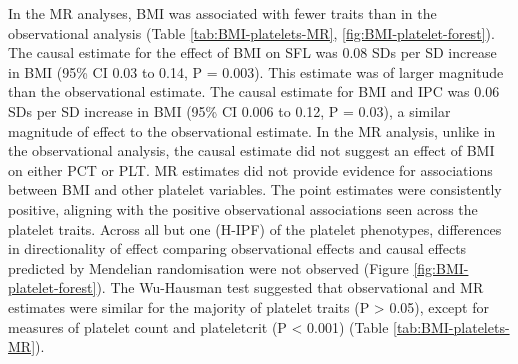 \documentclass[11pt,twoside]{bristolthesis}
\begin{document}
In the MR analyses, BMI was associated with fewer traits than in the observational analysis (Table \ref{tab:BMI-platelets-MR}, \ref{fig:BMI-platelet-forest}). The causal estimate for the effect of BMI on SFL was 0.08 SDs per SD increase in BMI (95\% CI 0.03 to 0.14, P = 0.003). This estimate was of larger magnitude than the observational estimate. The causal estimate for BMI and IPC was 0.06 SDs per SD increase in BMI (95\% CI 0.006 to 0.12, P = 0.03), a similar magnitude of effect to the observational estimate. In the MR analysis, unlike in the observational analysis, the causal estimate did not suggest an effect of BMI on either PCT or PLT. MR estimates did not provide evidence for associations between BMI and other platelet variables. The point estimates were consistently positive, aligning with the positive observational associations seen across the platelet traits. Across all but one (H-IPF) of the platelet phenotypes, differences in directionality of effect comparing observational effects and causal effects predicted by Mendelian randomisation were not observed (Figure \ref{fig:BMI-platelet-forest}).
The Wu-Hausman test suggested that observational and MR estimates were similar for the majority of platelet traits (P \textgreater{} 0.05), except for measures of platelet count and plateletcrit (P \textless{} 0.001) (Table \ref{tab:BMI-platelets-MR}).
\end{document}
